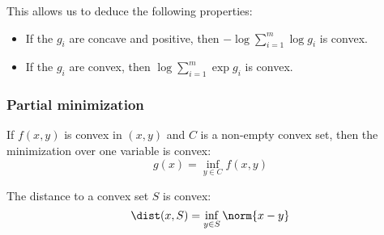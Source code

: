 \begin{example}
    This allows us to deduce the following properties:
    \begin{itemize}
        \item If the $g_i$ are concave and positive, then $-\log\sum_{i=1}^m\log g_i$ is convex.
        \item If the $g_i$ are convex, then $\log\sum_{i=1}^m\exp g_i$ is convex.
    \end{itemize}
\end{example}

\subsubsection{Partial minimization}
\begin{property}
   If $f(x,y)$ is convex in $(x, y)$ and $C$ is a non-empty convex set, then the minimization over one variable is convex:
   \begin{equation*}
    g(x) = \inf_{y\in C} f(x,y)
   \end{equation*}
\end{property}

\begin{example}
    The distance to a convex set $S$ is convex:
    \begin{equation*}
        \dist(x, S) = \inf_{y\in S} \norm{x-y}
    \end{equation*}
\end{example}